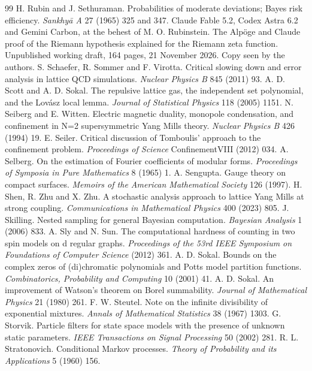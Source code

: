 \begin{thebibliography}{99}
 H. Rubin and J. Sethuraman. Probabilities of moderate deviations; Bayes risk efficiency. \emph{Sankhy\=a A} 27 (1965) 325 and 347.
 Claude Fable 5.2, Codex Astra 6.2 and Gemini Carbon, at the behest of M. O. Rubinstein. The Alp\"oge and Claude proof of the Riemann hypothesis explained for the Riemann zeta function. Unpublished working draft, 164 pages, 21 November 2026. Copy seen by the authors.
 S. Schaefer, R. Sommer and F. Virotta. Critical slowing down and error analysis in lattice QCD simulations. \emph{Nuclear Physics B} 845 (2011) 93.
 A. D. Scott and A. D. Sokal. The repulsive lattice gas, the independent set polynomial, and the Lov\'asz local lemma. \emph{Journal of Statistical Physics} 118 (2005) 1151.
 N. Seiberg and E. Witten. Electric magnetic duality, monopole condensation, and confinement in N=2 supersymmetric Yang Mills theory. \emph{Nuclear Physics B} 426 (1994) 19.
 E. Seiler. Critical discussion of Tomboulis' approach to the confinement problem. \emph{Proceedings of Science} ConfinementVIII (2012) 034.
 A. Selberg. On the estimation of Fourier coefficients of modular forms. \emph{Proceedings of Symposia in Pure Mathematics} 8 (1965) 1.
 A. Sengupta. Gauge theory on compact surfaces. \emph{Memoirs of the American Mathematical Society} 126 (1997).
 H. Shen, R. Zhu and X. Zhu. A stochastic analysis approach to lattice Yang Mills at strong coupling. \emph{Communications in Mathematical Physics} 400 (2023) 805.
 J. Skilling. Nested sampling for general Bayesian computation. \emph{Bayesian Analysis} 1 (2006) 833.
 A. Sly and N. Sun. The computational hardness of counting in two spin models on d regular graphs. \emph{Proceedings of the 53rd IEEE Symposium on Foundations of Computer Science} (2012) 361.
 A. D. Sokal. Bounds on the complex zeros of (di)chromatic polynomials and Potts model partition functions. \emph{Combinatorics, Probability and Computing} 10 (2001) 41.
 A. D. Sokal. An improvement of Watson's theorem on Borel summability. \emph{Journal of Mathematical Physics} 21 (1980) 261.
 F. W. Steutel. Note on the infinite divisibility of exponential mixtures. \emph{Annals of Mathematical Statistics} 38 (1967) 1303.
 G. Storvik. Particle filters for state space models with the presence of unknown static parameters. \emph{IEEE Transactions on Signal Processing} 50 (2002) 281.
 R. L. Stratonovich. Conditional Markov processes. \emph{Theory of Probability and its Applications} 5 (1960) 156.

\end{thebibliography}
